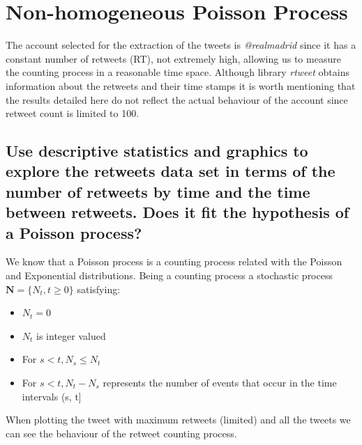 
\section{Non-homogeneous Poisson Process}

The account selected for the extraction of the tweets is \textit{@realmadrid} since it has a constant number of retweets (RT), not extremely high, allowing us to measure the counting process in a reasonable time space. 
Although library \textit{rtweet} obtains information about the retweets and their time stamps it is worth mentioning that the results detailed here do not reflect the actual behaviour of the account since retweet count is limited to 100.

\subsection{Use descriptive statistics and graphics to explore the retweets data set in terms of the number of retweets by time and the time between retweets. Does it fit the hypothesis of a Poisson process?}

We know that a Poisson process is a counting process related with the Poisson and Exponential distributions. 
Being a counting process a stochastic process $\mathbf{N} = \{ N_t, t \geq 0 \}$ satisfying:
\begin{itemize}
	\item $N_t=0$
	\item $N_t$ is integer valued
	\item For $s<t, N_s \leq N_t$
	\item For $s<t, N_t - N_s$ represents the number of events that occur in the time intervals (s, t]
\end{itemize}

When plotting the tweet with maximum retweets (limited) and all the tweets we can see the behaviour of the retweet counting process.

